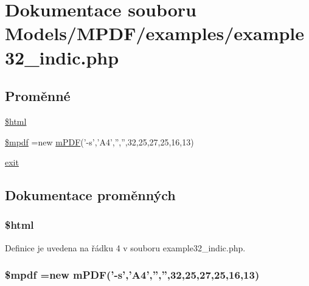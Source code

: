 \hypertarget{example32__indic_8php}{\section{Dokumentace souboru Models/\-M\-P\-D\-F/examples/example32\-\_\-indic.php}
\label{example32__indic_8php}
}
\subsection*{Proměnné}
\begin{DoxyCompactItemize}
\item 
\hyperlink{example32__indic_8php_a6f96e7fc92441776c9d1cd3386663b40}{\$html}
\item 
\hyperlink{example32__indic_8php_ad028f81910d6cbab9b184d2214b3a8f8}{\$mpdf} =new \hyperlink{classm_p_d_f}{m\-P\-D\-F}('-\/s','A4','','',32,25,27,25,16,13)
\item 
\hyperlink{example32__indic_8php_a6733eb5f605d09eaede9845835d71c4e}{exit}
\end{DoxyCompactItemize}


\subsection{Dokumentace proměnných}
\hypertarget{example32__indic_8php_a6f96e7fc92441776c9d1cd3386663b40}{
\subsubsection[{\$html}]{\setlength{\rightskip}{0pt plus 5cm}\$html}}\label{example32__indic_8php_a6f96e7fc92441776c9d1cd3386663b40}


Definice je uvedena na řádku 4 v souboru example32\-\_\-indic.\-php.

\hypertarget{example32__indic_8php_ad028f81910d6cbab9b184d2214b3a8f8}{
\subsubsection[{\$mpdf}]{\setlength{\rightskip}{0pt plus 5cm}\$mpdf =new {\bf m\-P\-D\-F}('-\/s','A4','','',32,25,27,25,16,13)}}\label{example32__indic_8php_ad028f81910d6cbab9b184d2214b3a8f8}


